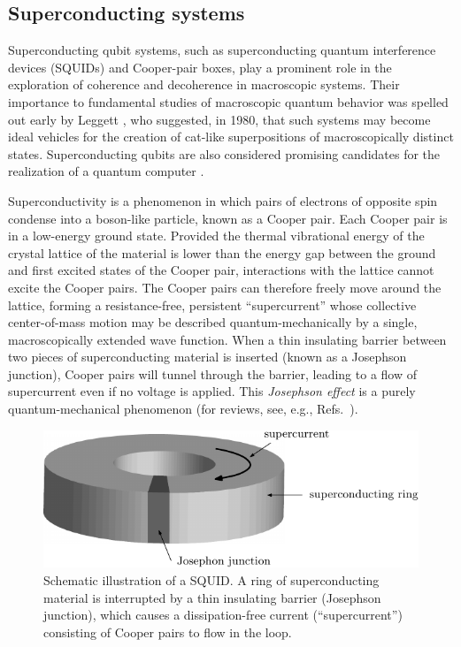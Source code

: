 \documentclass[3p,sort&compress,12pt]{elsarticle}
\begin{document}
\subsection{\label{sec:superc-syst}Superconducting systems}

Superconducting qubit systems, such as superconducting quantum interference devices (SQUIDs) and Cooper-pair boxes, play a prominent role in the exploration of coherence and decoherence in macroscopic systems. Their importance to fundamental studies of macroscopic quantum behavior was spelled out early by Leggett \cite{Leggett:1980:yt}, who suggested, in 1980, that such systems may become ideal vehicles for the creation of cat-like superpositions of macroscopically distinct states. Superconducting qubits are also considered promising candidates for the realization of a quantum computer \cite{Devoret:2013:pp}. 

Superconductivity is a phenomenon in which pairs of electrons of opposite spin condense into a boson-like particle, known as a Cooper pair. Each Cooper pair is in a low-energy ground  state. Provided the thermal vibrational energy of the crystal lattice of the material is lower than the energy gap between the ground and first excited states of the Cooper pair, interactions with the lattice cannot excite the Cooper pairs. The Cooper pairs can therefore freely move around the lattice, forming a resistance-free, persistent ``supercurrent'' whose collective center-of-mass motion may be described quantum-mechanically by a single, macroscopically extended wave function. When a thin insulating barrier between two pieces of superconducting material is inserted (known as a Josephson junction), Cooper pairs will tunnel through the barrier, leading to a flow of supercurrent even if no voltage is applied. This \emph{Josephson effect} is a purely quantum-mechanical phenomenon (for reviews, see, e.g., Refs.~\cite{Likharev:1979:ii,Makhlin:2001:oo}). 

\begin{figure}
  \centering
\includegraphics[scale=0.65]{squidscheme.pdf}
  \caption{Schematic illustration of a SQUID. A ring of superconducting material is interrupted by a thin insulating barrier (Josephson junction), which causes a dissipation-free current (``supercurrent'') consisting of Cooper pairs to flow in the loop.}
\label{fig:squidscheme} 
\end{figure}
\end{document}
